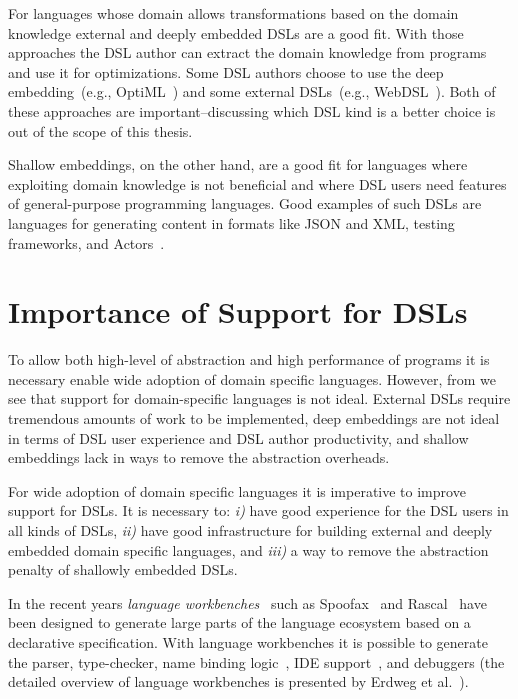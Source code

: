 For languages whose domain allows transformations based on the domain knowledge external
 and deeply embedded DSLs are a good fit. With those approaches the DSL author can extract
 the domain knowledge from programs and use it for optimizations. Some DSL authors
 choose to use the deep embedding~(e.g., OptiML~\cite{sujeeth_optiml:_2011}) and
 some external DSLs~(e.g., WebDSL~\cite{groenewegen2008webdsl}). Both of these approaches
 are important--discussing which DSL kind is a better choice is out of the scope of this thesis.


Shallow embeddings, on the other hand, are a good fit for languages where exploiting
 domain knowledge is not beneficial and where DSL users need features of general-purpose programming
 languages. Good examples of such DSLs are languages for generating content in formats like JSON
 and XML, testing frameworks, and Actors~\cite{haller2009scala}.


\section{Importance of Support for DSLs}
\label{sec:importance-of-language-support}

To allow both high-level of abstraction and high performance of programs it is necessary
 enable wide adoption of domain specific languages. However, from  we
 see that support for domain-specific languages is not ideal. External DSLs require
 tremendous amounts of work to be implemented, deep embeddings are not ideal in terms
 of DSL user experience and DSL author productivity, and shallow embeddings lack in
 ways to remove the abstraction overheads.

 For wide adoption of domain specific languages it is imperative to improve support
 for DSLs. It is necessary to: \emph{i)} have good experience for the DSL users in all kinds of DSLs,
  \emph{ii)} have good infrastructure for building external and deeply embedded domain specific languages, and \emph{iii)} a way to remove the abstraction penalty of shallowly embedded DSLs.

In the recent years \emph{language workbenches}~\cite{fowler2005language} such as
 Spoofax~\cite{kats2010spoofax} and Rascal~\cite{klint2009rascal,van2011rascal} have been designed
  to generate large parts of the language ecosystem based on a declarative specification.
  With language workbenches it is possible to generate the parser, type-checker, name binding logic~\cite{konat2013declarative},
  IDE support~\cite{lorenzen2013modular}, and debuggers (the detailed overview of language workbenches is presented by Erdweg et al.~\cite{erdweg2013state}).

